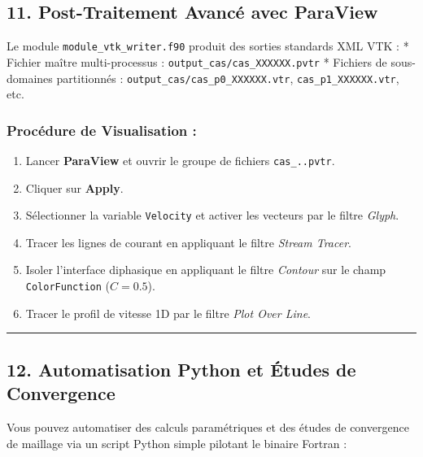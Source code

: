 \documentclass[
  french,
]{article}
\providecommand{\tightlist}{%
  \setlength{\itemsep}{0pt}\setlength{\parskip}{0pt}}
\begin{document}
\subsection{11. Post-Traitement Avancé avec
ParaView}\label{post-traitement-avancuxe9-avec-paraview}

Le module \texttt{module\_vtk\_writer.f90} produit des sorties standards
XML VTK : * Fichier maître multi-processus :
\texttt{output\_cas/cas\_XXXXXX.pvtr} * Fichiers de sous-domaines
partitionnés : \texttt{output\_cas/cas\_p0\_XXXXXX.vtr},
\texttt{cas\_p1\_XXXXXX.vtr}, etc.

\subsubsection{Procédure de Visualisation
:}\label{procuxe9dure-de-visualisation}

\begin{enumerate}
\def\labelenumi{\arabic{enumi}.}
\tightlist
\item
  Lancer \textbf{ParaView} et ouvrir le groupe de fichiers
  \texttt{cas\_..pvtr}.
\item
  Cliquer sur \textbf{Apply}.
\item
  Sélectionner la variable \texttt{Velocity} et activer les vecteurs par
  le filtre \emph{Glyph}.
\item
  Tracer les lignes de courant en appliquant le filtre \emph{Stream
  Tracer}.
\item
  Isoler l'interface diphasique en appliquant le filtre \emph{Contour}
  sur le champ \texttt{ColorFunction} (\(C = 0.5\)).
\item
  Tracer le profil de vitesse 1D par le filtre \emph{Plot Over Line}.
\end{enumerate}

\begin{center}\rule{0.5\linewidth}{0.5pt}\end{center}

\subsection{12. Automatisation Python et Études de
Convergence}\label{automatisation-python-et-uxe9tudes-de-convergence}

Vous pouvez automatiser des calculs paramétriques et des études de
convergence de maillage via un script Python simple pilotant le binaire
Fortran :
\end{document}
